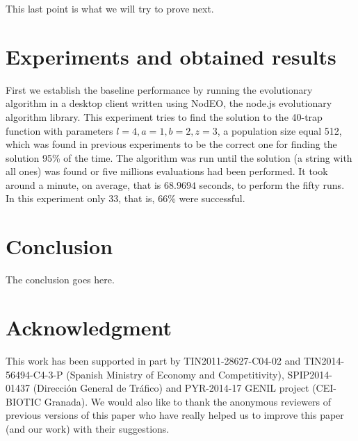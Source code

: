 \documentclass[journal,onecolumn]{IEEEtran}
\begin{document}
This last point is what we will try to prove next.

\section{Experiments and obtained results}
\label{sec:experiments}

First we establish the baseline performance by running the
evolutionary algorithm in a desktop client written using {\sf NodEO},
the node.js evolutionary algorithm library. This experiment tries to
find the solution to the 40-trap function with parameters $l=4, a=1,
b=2, z=3$, a population size equal 512, which was found in previous
experiments to be the correct one for finding the solution 95\% of the
time. The algorithm was run until the solution (a string with all
ones) was found or five millions evaluations had been performed. It
took around a minute, on average, that is $68.9694$ seconds, to
perform the fifty runs. In this experiment only 33, that is, 66\% were
successful. 


\section{Conclusion}
\label{sec:conclusion}

The conclusion goes here.


\section*{Acknowledgment}

This work has been supported in part by TIN2011-28627-C04-02 and
TIN2014-56494-C4-3-P (Spanish Ministry of Economy and Competitivity),
SPIP2014-01437 (Direcci{\'o}n General de Tr{\'a}fico) and PYR-2014-17
GENIL project (CEI-BIOTIC Granada). We would also like to thank the
anonymous reviewers of previous versions of this paper who have really helped us to improve
this paper (and our work) with their suggestions.




\end{document}
